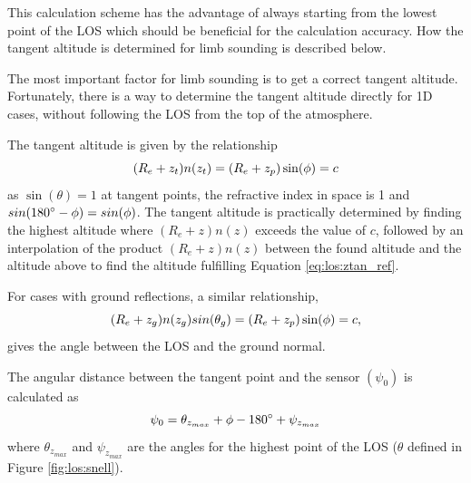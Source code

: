   This calculation scheme has the advantage of always starting from the 
  lowest point of the LOS which should be beneficial for the calculation
  accuracy. How the tangent altitude is determined for limb sounding is 
  described below. 
  

    
  The most important factor for limb sounding is to get a correct
  tangent altitude. Fortunately, there is a way to determine the
  tangent altitude directly for 1D cases, without following the LOS
  from the top of the atmosphere.

  The tangent altitude is given by the relationship
  \begin{equation}
    (R_e+z_t)n(z_t) = (R_e+z_p)\sin(\phi) = c
   \label{eq:los:ztan_ref}
  \end{equation}
  as $\sin(\theta)=1$ at tangent points, the refractive index in space
  is 1 and $sin(180^{\circ}-\phi)=sin(\phi)$. The tangent altitude
  is practically determined by finding the highest altitude where
  $(R_e+z)n(z)$ exceeds the value of $c$, followed by an interpolation
  of the product $(R_e+z)n(z)$ between the found altitude and the
  altitude above to find the altitude fulfilling Equation
  \ref{eq:los:ztan_ref}.
 
  For cases with ground reflections, a similar relationship,
  \begin{equation}
    (R_e+z_g)n(z_g)sin(\theta_g) = (R_e+z_p)\sin(\phi) = c,
  \end{equation}
  gives the angle between the LOS and the ground normal.

  The angular distance between the tangent point and the sensor $(\psi_0)$
  is calculated as
  \begin{equation}
    \psi_0 = \theta_{z_{max}} + \phi  - 180^\circ + \psi_{z_{max}}
  \end{equation}
  where $\theta_{z_{max}}$ and $\psi_{z_{max}}$ are the angles for the
  highest point of the LOS ($\theta$ defined in Figure \ref{fig:los:snell}).


